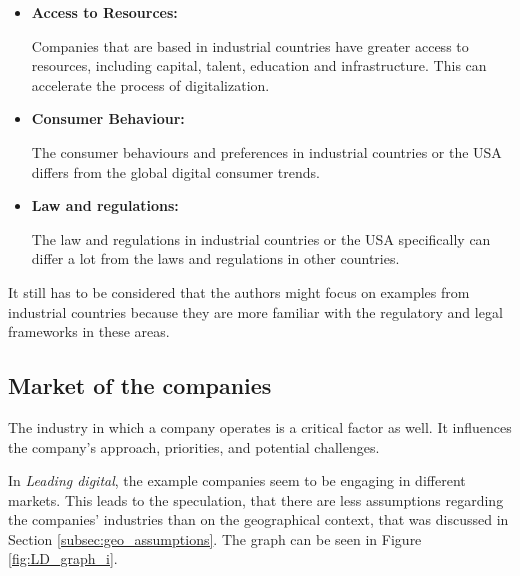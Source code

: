 \documentclass[a4]{scrartcl}
\begin{document}
\begin{itemize}
	\item \textbf{Access to Resources:} 
	
	Companies that are based in industrial countries have greater access to resources, including capital, talent, education and infrastructure. This can accelerate the process of digitalization. \cite{riic1, riic2}
	
	\item \textbf{Consumer Behaviour:}
	
	The consumer behaviours and preferences in industrial countries or the USA differs from the global digital consumer trends. \cite{consumerbehaviour}
	
	
	\item \textbf{Law and regulations:}
	
	The law and regulations in industrial countries or the USA specifically can differ a lot from the laws and regulations in other countries.
	
	
\end{itemize}

It still has to be considered that the authors might focus on examples from industrial countries because they are more familiar with the regulatory and legal frameworks in these areas.











\subsection{Market of the companies} \label{subsec:market_assumptions}

The industry in which a company operates  is a critical factor as well. It influences the company's approach, priorities, and potential challenges.


In \textit{Leading digital}, the example companies seem to be engaging in different markets. This leads to the speculation, that there are less assumptions regarding the companies' industries than on the geographical context, that was discussed in Section \ref{subsec:geo_assumptions}. The graph can be seen in Figure \ref{fig:LD_graph_i}.
\end{document}
